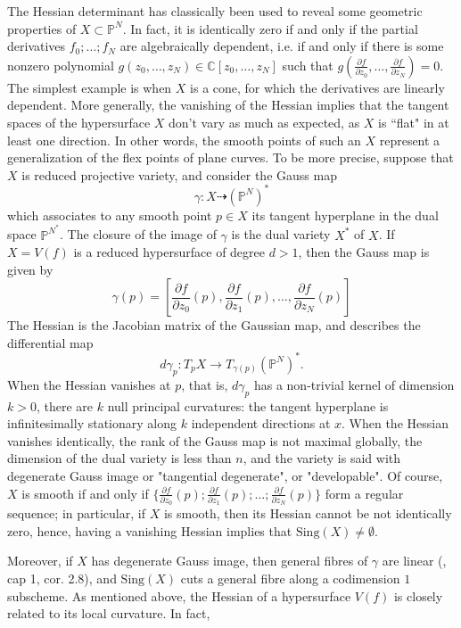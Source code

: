 \documentclass[letterpaper,11pt]{amsart}
\theoremstyle{plain}
\theoremstyle{definition}
\newcommand{\enm}[1]{\ensuremath{#1}}          %
\newcommand{\Sing}{\enm{\mathrm{Sing}}}
\begin{document}
The Hessian determinant has classically been used to reveal some geometric properties of $X\subset \mathbb{P}^N$. In fact, it is identically zero if and only if the partial derivatives $f_0;\dots;f_N$ are algebraically dependent, i.e. if and only if there is some nonzero polynomial $g(z_0,\dots,z_N) \in
\mathbb{C}[z_0,\dots,z_N]$ such that $g(\frac{\partial f}{\partial z_0},\dots,\frac{\partial f}{\partial z_N})= 0$. The simplest example is when  $X$ is a cone, for which the derivatives are linearly dependent.  More  generally, the vanishing of the Hessian implies that the tangent spaces of the hypersurface $X$  don't vary as much as expected, as  $X$ is ``flat" in at least one direction. In other words, the smooth points of such an $X$ represent a  generalization of the flex points of plane curves.
To be more precise,  suppose that $X$ is reduced projective variety,  and consider the Gauss map \[
\gamma: X \dashrightarrow (\mathbb{P}^N)^*
\] which associates to any smooth point $p\in X$ its tangent hyperplane in the dual space $\mathbb{P}^{N^*}$. The closure of the image of $\gamma$ is the dual variety $X^*$ of $X$. If $X=V(f)$ is a reduced hypersurface of degree $d>1$, then the Gauss map is given by 
\[
\gamma(p) = \left[ \frac{\partial f}{\partial z_0}(p) , \frac{\partial f}{\partial z_1}(p) , \dots , \frac{\partial f}{\partial z_N}(p) \right]
\]  The Hessian is the Jacobian matrix of the Gaussian map, and describes the differential map \[
d\gamma_p: T_p X \to T_{\gamma(p)} (\mathbb{P}^N)^*.
\]
 When the Hessian vanishes at $p$, that is, $d\gamma_p$ has a non-trivial kernel of dimension $k > 0$,  there are $k$ null principal curvatures:  the tangent hyperplane 
 is infinitesimally stationary along $k$
 independent directions at 
$x$.
When  the Hessian vanishes identically,  the rank of the Gauss map is not maximal globally, the dimension of the dual variety  is less than $n$, and the variety is said with degenerate Gauss image or "tangential degenerate", or "developable". Of course,  $ X$ is smooth if and only if  $\{\frac{\partial f}{\partial z_0}(p) ; \frac{\partial f}{\partial z_1}(p) ; \dots ; \frac{\partial f}{\partial z_N}(p)\} $ form a regular sequence; in particular,
if $X$ is smooth, then its Hessian cannot be not identically zero, hence, having a vanishing Hessian implies  that 
$\Sing(X)\neq \emptyset$. 

Moreover, if $X$ has degenerate Gauss image, then  general fibres of $\gamma$ are linear (\cite{Z}, cap 1, cor. 2.8), and $\Sing(X)$  cuts a general fibre along a codimension $1$ subscheme.
As mentioned above, the Hessian of a hypersurface $V(f)$ is closely related to its local curvature. In  fact,
\end{document}
